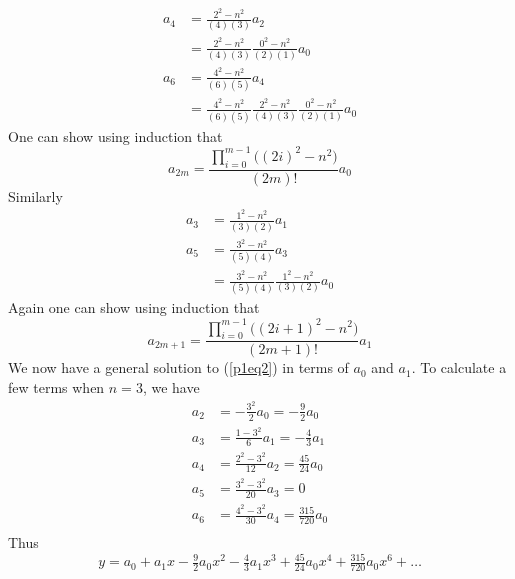 \documentclass[12pt]{article}
\begin{document}
	\begin{align*}
		a_4 & = \frac{2^2 - n^2}{(4)(3)}a_2 \\
		& = \frac{2^2 - n^2}{(4)(3)}\frac{0^2-n^2}{(2)(1)}a_0 \\
		a_6 & = \frac{4^2-n^2}{(6)(5)} a_4 \\
		& = \frac{4^2-n^2}{(6)(5)}\frac{2^2 - n^2}{(4)(3)}\frac{0^2-n^2}{(2)(1)}a_0
	\end{align*}
	One can show using induction that 
	$$
	a_{2m} = \frac{\prod\limits_{i=0}^{m-1} \Big( (2i)^2-n^2 \Big)}{(2m)!}a_0
	$$
	Similarly
	\begin{align*}
		a_3 & = \frac{1^2 - n^2}{(3)(2)}a_1 \\
		a_5 & = \frac{3^2-n^2}{(5)(4)} a_3 \\
		& = \frac{3^2-n^2}{(5)(4)}\frac{1^2 - n^2}{(3)(2)}a_0
	\end{align*}
	Again one can show using induction that 
	$$
	a_{2m+1} = \frac{\prod\limits_{i=0}^{m-1} \Big( (2i+1)^2-n^2 \Big)}{(2m+1)!}a_1
	$$
	We now have a general solution to (\ref{p1eq2}) in terms of $a_0$ and $a_1$. To calculate a few terms when $n=3$, we have 
	\begin{align*}
		a_2 & = -\tfrac{3^2}{2}a_0 = -\tfrac{9}{2}a_0 \\
		a_3 & = \tfrac{1-3^2}{6}a_1 = -\tfrac{4}{3}a_1 \\
		a_4 & = \tfrac{2^2 - 3^2}{12}a_2 = \tfrac{45}{24}a_0 \\
		a_5 &= \tfrac{3^2 - 3^2}{20}a_3 = 0 \\
		a_6 & = \tfrac{4^2 - 3^2}{30}a_4 = \tfrac{315}{720}a_0 \\
	\end{align*}
	Thus 
	$$
	y = a_0 + a_1x -\tfrac{9}{2}a_0 x^2 -\tfrac{4}{3}a_1 x^3 + \tfrac{45}{24}a_0 x^4 + \tfrac{315}{720}a_0 x^6 + \dots
	$$
	
\end{document}
